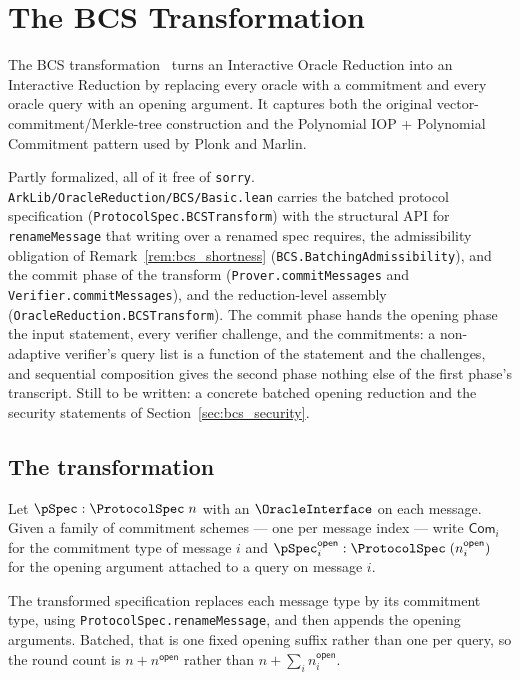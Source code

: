 \section{The BCS Transformation}\label{sec:bcs}

The BCS transformation~\cite{BCS16} turns an Interactive Oracle Reduction into an Interactive
Reduction by replacing every oracle with a commitment and every oracle query with an opening
argument. It captures both the original vector-commitment/Merkle-tree construction and the
Polynomial IOP + Polynomial Commitment pattern used by Plonk and Marlin.

Partly formalized, all of it free of \texttt{sorry}.
\texttt{ArkLib/OracleReduction/BCS/Basic.lean} carries the batched protocol
specification (\texttt{ProtocolSpec.BCSTransform}) with the structural API for
\texttt{renameMessage} that writing over a renamed spec requires, the admissibility
obligation of Remark~\ref{rem:bcs_shortness} (\texttt{BCS.BatchingAdmissibility}), and
the commit phase of the transform (\texttt{Prover.commitMessages} and
\texttt{Verifier.commitMessages}), and the reduction-level assembly
(\texttt{OracleReduction.BCSTransform}). The commit phase hands the opening phase the
input statement, every verifier challenge, and the commitments: a non-adaptive verifier's
query list is a function of the statement and the challenges, and sequential composition
gives the second phase nothing else of the first phase's transcript. Still to be written:
a concrete batched opening reduction and the security statements of
Section~\ref{sec:bcs_security}.

\subsection{The transformation}\label{sec:bcs_transform}

\begin{definition}
    \label{def:bcs_pspec}
    Let $\pSpec : \ProtocolSpec\;n$ with an $\OracleInterface$ on each message. Given a family of
    commitment schemes --- one per message index --- write $\mathsf{Com}_i$ for the commitment type
    of message $i$ and $\pSpec^{\mathsf{open}}_i : \ProtocolSpec\;(n^{\mathsf{open}}_i)$ for the
    opening argument attached to a query on message $i$.

    The transformed specification replaces each message type by its commitment type, using
    \texttt{ProtocolSpec.\allowbreak renameMessage}, and then appends the opening arguments.
    Batched,
    that is one fixed opening suffix rather than one per query, so the round count is
    $n + n^{\mathsf{open}}$ rather than $n + \sum_i n^{\mathsf{open}}_i$.
\end{definition}


